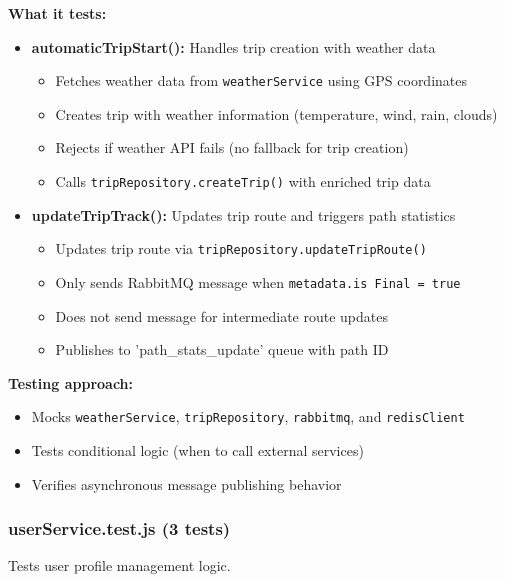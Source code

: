 \textbf{What it tests:}
\begin{itemize}
    \item \textbf{automaticTripStart():} Handles trip creation with weather data
    \begin{itemize}
        \item Fetches weather data from \texttt{weatherService} using GPS coordinates
        \item Creates trip with weather information (temperature, wind, rain, clouds)
        \item Rejects if weather API fails (no fallback for trip creation)
        \item Calls \texttt{tripRepository.createTrip()} with enriched trip data
    \end{itemize}
    
    \item \textbf{updateTripTrack():} Updates trip route and triggers path statistics
    \begin{itemize}
        \item Updates trip route via \texttt{tripRepository.updateTripRoute()}
        \item Only sends RabbitMQ message when \texttt{metadata.is Final = true}
        \item Does not send message for intermediate route updates
        \item Publishes to 'path\_stats\_update' queue with path ID
    \end{itemize}
\end{itemize}

\textbf{Testing approach:}
\begin{itemize}
    \item Mocks \texttt{weatherService}, \texttt{tripRepository}, \texttt{rabbitmq}, and \texttt{redisClient}
    \item Tests conditional logic (when to call external services)
    \item Verifies asynchronous message publishing behavior
\end{itemize}

\subsubsection{userService.test.js (3 tests)}
\label{subsubsec:user_service_test}

Tests user profile management logic.

